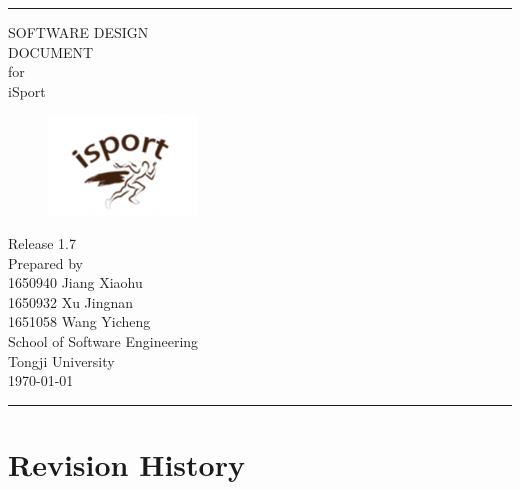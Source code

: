 \documentclass[16pt]{scrreprt}
\date{}
\def\myversion{1.7}
\begin{document}
\begin{flushright}
    \rule{16cm}{5pt}\vskip1cm
    \Huge{SOFTWARE DESIGN\\ DOCUMENT}\\
    \vspace{0.3cm}
    for\\
    \vspace{0.4cm}
    iSport\\
    \begin{figure}[H]
        \flushright
          \includegraphics[width=.2\textwidth]{diagrams/logo.png}
        \end{figure}
    \normalsize{Release \myversion \\}
    \vspace{1cm}
    Prepared by\vspace{0.5cm} \\ 
        \normalsize{1650940 Jiang Xiaohu\\1650932 Xu Jingnan\\1651058 Wang Yicheng}
        \\
        \vspace{1.1cm}
        \normalsize{School of Software Engineering\\ Tongji University}\\
        \vspace{1.0cm}
        \today
    \vfill
    \rule{16cm}{5pt}
\end{flushright}

\tableofcontents

\chapter*{Revision History}
\end{document}
